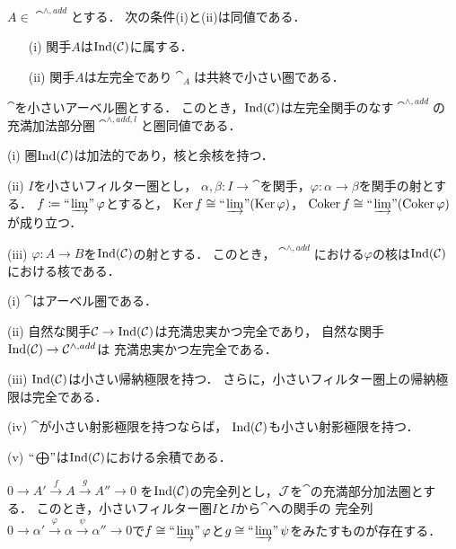 \begin{Proposition}
    $A\in\cat^{\wedge,add}$とする．
    次の条件(i)と(ii)は同値である．
    \begin{enumerate}
        \item [(i)]関手$A$は$\mathop{\mathrm{Ind}}(\mathcal{C})$に属する．
        \item [(ii)]関手$A$は左完全であり$\cat_A$は共終で小さい圏である．
    \end{enumerate}
\end{Proposition}

\begin{Corollary}
    $\cat$を小さいアーベル圏とする．
    このとき，$\mathop{\mathrm{Ind}}(\mathcal{C})$は左完全関手のなす$\cat^{\wedge,add}$の
    充満加法部分圏$\cat^{\wedge,add,l}$と圏同値である．
\end{Corollary}

\begin{Lemma}\label{lem:ind-property}
    (i) 
    圏$\mathop{\mathrm{Ind}}(\mathcal{C})$は加法的であり，核と余核を持つ．

    (ii) 
    $I$を小さいフィルター圏とし，
    $\alpha, \beta\colon I\to\cat$を関手，$\varphi\colon\alpha\to\beta$を関手の射とする．
    $f\coloneqq\mathop{\text{``}\hspace{-0.7pt}\varinjlim\hspace{-1.5pt}\text{''}}\varphi$とすると，
    $\mathop{\mathrm{Ker}}\nolimits f\cong\mathop{\text{``}\hspace{-0.7pt}\varinjlim\hspace{-1.5pt}\text{''}}(\mathop{\mathrm{Ker}}\nolimits\varphi)$，
    $\mathop{\mathrm{Coker}}\nolimits f\cong\mathop{\text{``}\hspace{-0.7pt}\varinjlim\hspace{-1.5pt}\text{''}}(\mathop{\mathrm{Coker}}\nolimits\varphi)$が成り立つ．

    (iii) 
    $\varphi\colon A\to B$を$\mathop{\mathrm{Ind}}(\mathcal{C})$の射とする．
    このとき，$\cat^{\wedge,add}$における$\varphi$の核は$\mathop{\mathrm{Ind}}(\mathcal{C})$における核である．
\end{Lemma}


\begin{Theorem}
    (i) 
    $\cat$はアーベル圏である．

    (ii) 
    自然な関手$\mathcal{C}\to\mathop{\mathrm{Ind}}(\mathcal{C})$は充満忠実かつ完全であり，
    自然な関手$\mathop{\mathrm{Ind}}(\mathcal{C})\to\mathcal{C}^{\wedge,add}$は
    充満忠実かつ左完全である．

    (iii) 
    $\mathop{\mathrm{Ind}}(\mathcal{C})$は小さい帰納極限を持つ．
    さらに，小さいフィルター圏上の帰納極限は完全である．

    (iv) 
    $\cat$が小さい射影極限を持つならば，
    $\mathop{\mathrm{Ind}}(\mathcal{C})$も小さい射影極限を持つ．

    (v) 
    $\ind<\bigoplus>$は$\mathop{\mathrm{Ind}}(\mathcal{C})$における余積である．
\end{Theorem}



\begin{Proposition}\label{prop:ind-exact}
    $0\to A'\overset{f}{\to}A\overset{g}{\to}A''\to 0$
    を$\mathop{\mathrm{Ind}}(\mathcal{C})$の完全列とし，$\mathcal{J}$を$\cat$の充満部分加法圏とする．
    このとき，小さいフィルター圏$I$と$I$から$\cat$への関手の
    完全列$0\to \alpha'
    \overset{\varphi}{\to}\alpha
    \overset{\psi}{\to}\alpha''\to 0$で$f\cong\mathop{\text{``}\hspace{-0.7pt}\varinjlim\hspace{-1.5pt}\text{''}}\varphi$と$g\cong\mathop{\text{``}\hspace{-0.7pt}\varinjlim\hspace{-1.5pt}\text{''}}\psi$をみたすものが存在する．
\end{Proposition}

